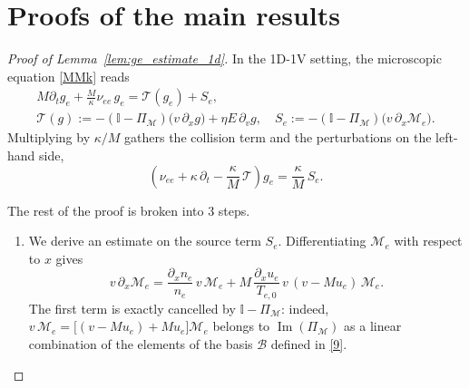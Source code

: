 \documentclass[pdflatex,final,10pt]{article}
\begin{document}
%
  \appendix
\section{Proofs of the main results}  \label{app:proof}
\begin{proof}[Proof of Lemma~\ref{lem:ge_estimate_1d}]
In the 1D-1V setting, the microscopic equation \eqref{MMk} reads
\begin{equation} \label{eq:ge_governing_1d}
        \begin{gathered}
    M \partial_t g_e + \frac{M}{\kappa}\nu_{ee}\, g_e
    = \mathcal{T}(g_e) + S_e,
    \\
        \mathcal{T}(g) := -(\mathbb{I}-\Pi_{\mathcal{M}})
                            \big(v\,\partial_x g\big)
                            + \eta E\, \partial_v g , \quad
        S_e := -(\mathbb{I}-\Pi_{\mathcal{M}})
                 \big(v\,\partial_x\mathcal{M}_e\big) .
    \end{gathered}
\end{equation}
Multiplying by $\kappa/M$ gathers the collision term and the perturbations on the left-hand side,
\begin{equation} \label{eq:ge_balance}
    \left( \nu_{ee} + \kappa\, \partial_t
           - \frac{\kappa}{M}\,\mathcal{T} \right) g_e
    = \frac{\kappa}{M}\, S_e .
\end{equation}

The rest of the proof is broken into 3 steps.
\begin{enumerate}
    \item We derive an estimate on the source term $S_e$. Differentiating $\mathcal{M}_e$ with respect to $x$ gives
\begin{equation*}
    v\,\partial_x \mathcal{M}_e
    = \frac{\partial_x n_e}{n_e}\, v\,\mathcal{M}_e
    + M\,\frac{\partial_x u_e}{T_{e,0}}\, v\,(v-Mu_e)\,\mathcal{M}_e .
\end{equation*}
The first term is exactly cancelled by $\mathbb{I}-\Pi_{\mathcal{M}}$: indeed,
$v\,\mathcal{M}_e = \big[(v-Mu_e) + Mu_e\big]\mathcal{M}_e$ belongs to
$\operatorname{Im}(\Pi_{\mathcal{M}})$ as a linear combination of the elements
of the basis $\mathcal{B}$ defined in \eqref{9}.


\end{enumerate}
\end{proof}
\end{document}
